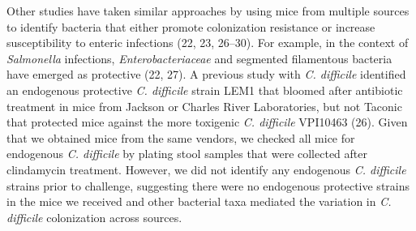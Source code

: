 \documentclass[
  11pt,
]{article}
\begin{document}
Other studies have taken similar approaches by using mice from multiple
sources to identify bacteria that either promote colonization resistance
or increase susceptibility to enteric infections (22, 23, 26--30). For
example, in the context of \emph{Salmonella} infections,
\emph{Enterobacteriaceae} and segmented filamentous bacteria have
emerged as protective (22, 27). A previous study with \emph{C.
difficile} identified an endogenous protective \emph{C. difficile}
strain LEM1 that bloomed after antibiotic treatment in mice from Jackson
or Charles River Laboratories, but not Taconic that protected mice
against the more toxigenic \emph{C. difficile} VPI10463 (26). Given that
we obtained mice from the same vendors, we checked all mice for
endogenous \emph{C. difficile} by plating stool samples that were
collected after clindamycin treatment. However, we did not identify any
endogenous \emph{C. difficile} strains prior to challenge, suggesting
there were no endogenous protective strains in the mice we received and
other bacterial taxa mediated the variation in \emph{C. difficile}
colonization across sources.
\end{document}
